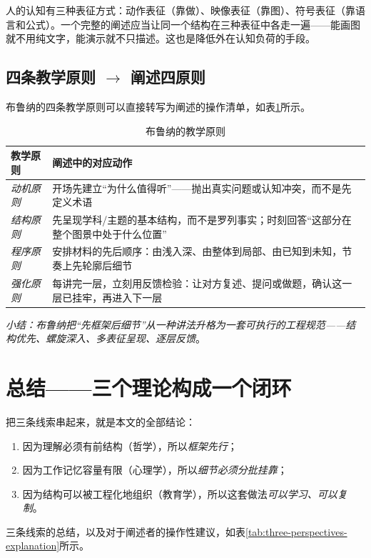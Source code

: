 人的认知有三种表征方式：动作表征（靠做）、映像表征（靠图）、符号表征（靠语言和公式）。一个完整的阐述应当让同一个结构在三种表征中各走一遍——能画图就不用纯文字，能演示就不只描述。这也是降低外在认知负荷的手段。

\subsection{四条教学原则 $\to$ 阐述四原则}

布鲁纳的四条教学原则可以直接转写为阐述的操作清单，如表\ref{tab:teaching-principle}所示。
\begin{table}[htbp]
    \centering
    \caption{布鲁纳的教学原则}
    \label{tab:teaching-principle}
    \begin{tabularx}{\textwidth}{l >{\raggedright\arraybackslash}X}
        \toprule
        \textbf{教学原则} & \textbf{阐述中的对应动作} \\
        \midrule
        \textit{动机原则} & 开场先建立“为什么值得听”——抛出真实问题或认知冲突，而不是先定义术语 \\
        \textit{结构原则} & 先呈现学科/主题的基本结构，而不是罗列事实；时刻回答“这部分在整个图景中处于什么位置” \\
        \textit{程序原则} & 安排材料的先后顺序：由浅入深、由整体到局部、由已知到未知，节奏上先轮廓后细节 \\
        \textit{强化原则} & 每讲完一层，立刻用反馈检验：让对方复述、提问或做题，确认这一层已挂牢，再进入下一层 \\
        \bottomrule
    \end{tabularx}
\end{table}

\nid\textit{小结：布鲁纳把“先框架后细节”从一种讲法升格为一套可执行的工程规范——结构优先、螺旋深入、多表征呈现、逐层反馈}。

\section{总结——三个理论构成一个闭环}

把三条线索串起来，就是本文的全部结论：
\begin{enumerate}[label=\arabic*.]
    \item 因为理解必须有前结构（哲学），所以\textit{框架先行}；
    \item 因为工作记忆容量有限（心理学），所以\textit{细节必须分批挂靠}；
    \item 因为结构可以被工程化地组织（教育学），所以这套做法\textit{可以学习、可以复制}。
\end{enumerate}
\nid 三条线索的总结，以及对于阐述者的操作性建议，如表\ref{tab:three-perspectives-explanation}所示。


